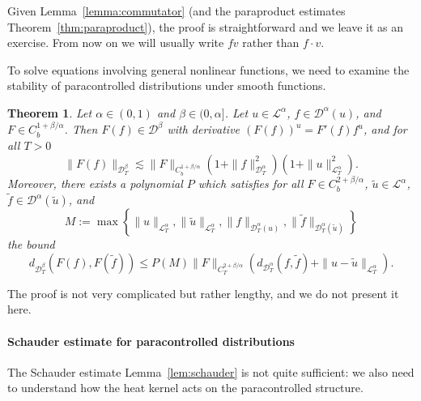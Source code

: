 \documentclass[a4paper,11pt]{article}
\newcommand{\assign}{:=}
\newcommand{\cdummy}{\cdot}
\newcommand{\nocomma}{}
\newtheorem{theorem}{Theorem}
\newcommand{\LL}{\mathscr{L}}
\newcommand{\DD}{\mathscr{D}}
\begin{document}
Given Lemma~\ref{lemma:commutator} (and the paraproduct estimates
Theorem~\ref{thm:paraproduct}), the proof is straightforward and we leave it
as an exercise. From now on we will usually write $f v$ rather than $f \cdummy
v$.

To solve equations involving general nonlinear functions, we need to examine
the stability of paracontrolled distributions under smooth functions.

\begin{theorem}
  \label{thm:paralinearization}Let $\alpha \in (0, 1)$ and $\beta \in (0,
  \alpha]$. Let $u \in \LL^{\alpha}$, $f \in \DD^{\alpha} (u)$, and $F \in
  C^{1 + \beta / \alpha}_b$. Then $F (f) \in \DD^{\beta}$ with derivative $(F
  (f))^u = F' (f) f^u$, and for all $T > 0$
  \[
     \| F (f) \|_{\DD^{\beta}_T} \lesssim \| F \|_{C^{1 + \beta / \alpha}_b} ( 1 + \| f \|^2_{\DD^{\alpha}_T} ) ( 1 + \| u  \|_{\LL_T^{\alpha}}^2 ) .
  \]
  Moreover, there exists a polynomial $P$ which satisfies for all $F \in C^{2
  + \beta / \alpha}_b$, $\tilde{u} \in \LL^{\alpha} \nocomma$, $\tilde{f} \in
  \DD^{\alpha} (\tilde{u})$, and
  \[ M \assign \max \left\{ \| u \|_{\LL^{\alpha}_T}, \| \tilde{u}
     \|_{\LL^{\alpha}_T}, \|f\|_{\DD^{\alpha}_T (u)}, \| \tilde{f}
     \|_{\DD^{\alpha}_T (\tilde{u})} \right\} \]
  the bound
  \[ d_{\DD^{\beta}_T} (F (f), F (\tilde{f})) \leqslant P (M) \| F \|_{C^{2 +
     \beta / \alpha}_T} ( d_{\DD^{\alpha}_T} (f, \tilde{f}) + \| u -
     \tilde{u} \|_{\LL^{\alpha}_T} ) . \]
\end{theorem}

The proof is not very complicated but rather lengthy, and we do not present it
here.

\paragraph{Schauder estimate for paracontrolled distributions}The Schauder
estimate Lemma~\ref{lem:schauder} is not quite sufficient: we also need to
understand how the heat kernel acts on the paracontrolled structure.
\end{document}
